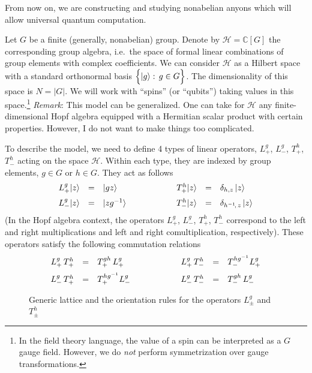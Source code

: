 \documentclass[12pt]{article}
\newcommand*{\epsfscale}[1]{\def\epsfsize##1##2{#1##1}}
\newcommand{\C}{\mathbb{C}}
\newcommand{\del}{\delta} %
\newcommand{\calH}{\mathcal{H}}
\begin{document}
 From now on, we are constructing and studying nonabelian anyons which will 
allow universal quantum computation.

Let $G$ be a finite (generally, nonabelian) group. Denote by $\calH=\C[G]$ the 
corresponding group algebra, i.e.\ the space of formal linear combinations of 
group elements with complex coefficients. We can consider $\calH$ as a Hilbert 
space with a standard orthonormal basis $\Bigl\{|g\rangle:\, g\in G\Bigr\}$.
The dimensionality of this space is $N=|G|$. We will work with ``spins''
(or ``qubits'')  taking values in this space.\footnote{
 In the field theory language, the value of a spin can be interpreted as a 
 $G$ gauge field. However, we do \emph{not} perform symmetrization over gauge
 transformations.}
\emph{Remark}: This model can be generalized. One can take for $\calH$ any 
finite-dimensional Hopf algebra equipped with a Hermitian scalar product with 
certain properties. However, I do not want to make things too complicated.

To describe the model, we need to define 4 types of linear operators, 
$L_+^g$, $L_-^g$, $T_+^h$, $T_-^h$ acting on the space $\calH$. 
Within each type, they are indexed by group elements, $g\in G$ or $h\in G$. 
They act as follows
\begin{equation}
  \begin{array}{rclcrcl}
    L_+^g|z\rangle &=& |gz\rangle &\qquad\qquad&
    T_+^h|z\rangle &=& \del_{h,z}\,|z\rangle      \medskip\\
    L_-^g|z\rangle &=& |zg^{-1}\rangle &\qquad\qquad&
    T_-^h|z\rangle &=& \del_{h^{-1}\!,\,z}\,|z\rangle
  \end{array}
\end{equation}
(In the Hopf algebra context, the operators $L_+^g$, $L_-^g$, $T_+^h$, $T_-^h$ 
correspond to the left and right multiplications and left and right 
comultiplication, respectively). These operators  satisfy the following 
commutation relations
\begin{equation} \label{commLT}
  \begin{array}{rclcrcl}
    L_+^g\, T_+^h &=& T_+^{gh}\, L_+^g &\qquad\qquad&
    L_+^g\, T_-^h &=& T_-^{hg^{-1}} L_+^g     \medskip\\
    L_-^g\, T_+^h &=& T_+^{hg^{-1}} L_-^g &\qquad\qquad&
    L_-^g\, T_-^h &=& T_-^{gh}\, L_-^g
  \end{array}
\end{equation}

\begin{figure}[t]
\centerline{\epsfscale{0.6}}
\caption{Generic lattice and the orientation rules for the operators 
         $L^g_\pm$ and $T^h_\pm$}
\label{fig_lattice}
\end{figure}
\end{document}
